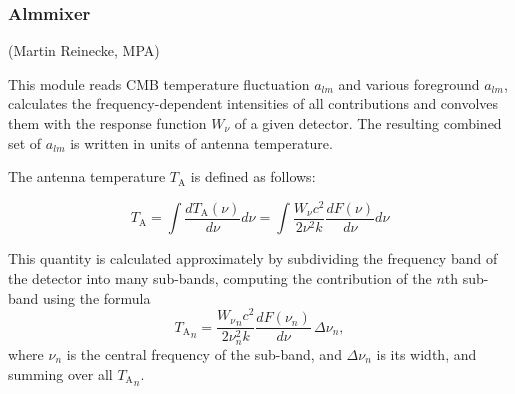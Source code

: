 \subsubsection{Almmixer}
\label{almmix}

(Martin Reinecke, MPA)

This module reads CMB temperature fluctuation $a_{lm}$ and various
foreground $a_{lm}$, calculates the frequency-dependent intensities of all
contributions and convolves them with the response function $W_\nu$ of
a given detector. The resulting combined set of $a_{lm}$ is written in units of
antenna temperature.

The antenna temperature $T_\mathrm{A}$ is defined as follows:

\begin{equation}
T_\mathrm{A} = \int \frac{d T_\mathrm{A}(\nu)}{d \nu}  d \nu
    = \int \frac{W_\nu c^2}{2 \nu^2 k} \frac{d F(\nu)}{d \nu} d \nu
\end{equation}

This quantity is calculated approximately by subdividing the frequency band
of the detector into many sub-bands, computing the contribution of the $n$th
sub-band using the formula
\begin{equation}
{T_\mathrm{A}}_n = \frac{{W_\nu}_n c^2}{2 \nu_n^2 k}
                   \frac{d F(\nu_n)}{d \nu}\, \Delta\nu_n,
\end{equation}
where $\nu_n$ is the central frequency of the sub-band, and $\Delta\nu_n$ is its
width, and summing over all ${T_\mathrm{A}}_n$.

